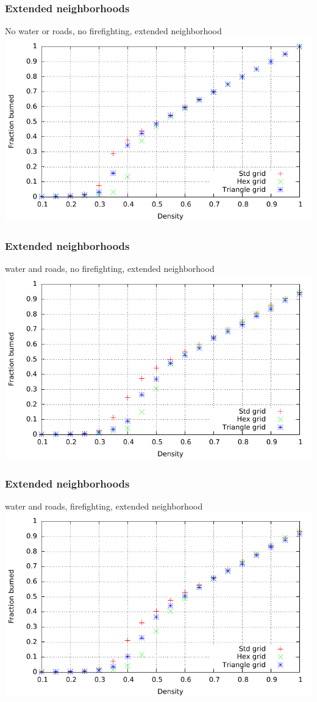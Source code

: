 \documentclass{beamer}
\begin{document}
\begin{frame}
\frametitle{Extended neighborhoods}
No water or roads, no firefighting, extended neighborhood
\centering
\includegraphics[width=\textwidth]{imgs/plot/ex2/fracburned.pdf}
\end{frame}

\begin{frame}
\frametitle{Extended neighborhoods}
water and roads, no firefighting, extended neighborhood
\centering
\includegraphics[width=\textwidth]{imgs/plot/ex4/fracburned.pdf}
\end{frame}

\begin{frame}
\frametitle{Extended neighborhoods}
water and roads, firefighting, extended neighborhood
\centering
\includegraphics[width=\textwidth]{imgs/plot/ex6/fracburned.pdf}
\end{frame}
\end{document}
